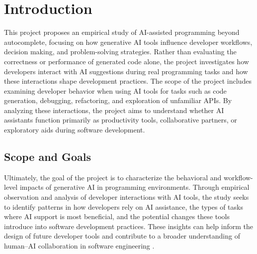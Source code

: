 \section{Introduction}
This project proposes an empirical study of AI-assisted programming beyond autocomplete, focusing on how generative AI tools influence developer workflows, decision making, and problem-solving strategies. Rather than evaluating the correctness or performance of generated code alone, the project investigates how developers interact with AI suggestions during real programming tasks and how these interactions shape development practices. The scope of the project includes examining developer behavior when using AI tools for tasks such as code generation, debugging, refactoring, and exploration of unfamiliar APIs. By analyzing these interactions, the project aims to understand whether AI assistants function primarily as productivity tools, collaborative partners, or exploratory aids during software development.

\subsection{Scope and Goals}

Ultimately, the goal of the project is to characterize the behavioral and workflow-level impacts of generative AI in programming environments. Through empirical observation and analysis of developer interactions with AI tools, the study seeks to identify patterns in how developers rely on AI assistance, the types of tasks where AI support is most beneficial, and the potential changes these tools introduce into software development practices. These insights can help inform the design of future developer tools and contribute to a broader understanding of human–AI collaboration in software engineering \cite{robillard2014recommender,buseweimer2010learning}.

